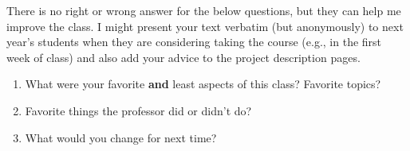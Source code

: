 \documentclass[10pt]{article}
\begin{document}
There is no right or wrong answer for the below questions, but they can help me improve the class. 
I might present your text verbatim (but anonymously) to next year's students when they are considering taking the course (e.g., in the first week of class) and also add your advice to the project description pages.

\begin{enumerate}
\item What were your favorite \textbf{and} least aspects of this class? Favorite topics?
\item Favorite things the professor did or didn't do?
\item What would you change for next time?
\end{enumerate}
\end{document}
